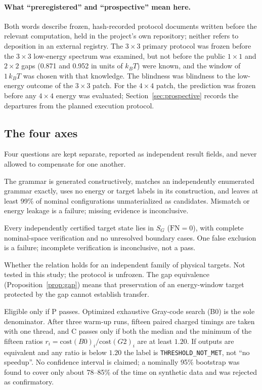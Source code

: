 \documentclass[11pt,a4paper]{article}
\theoremstyle{plain}
\theoremstyle{definition}
\theoremstyle{remark}
\newcommand{\lean}[1]{\nolinkurl{#1}}
\newcommand{\SG}{S_{G}}
\newcommand{\kBT}{k_{B}T}
\begin{document}
\paragraph{What ``preregistered'' and ``prospective'' mean here.}
Both words describe frozen, hash-recorded protocol documents written before the relevant computation, held in the project's own repository; neither refers to deposition in an external registry. The $3\times3$ primary protocol was frozen before the $3\times3$ low-energy spectrum was examined, but not before the public $1\times1$ and $2\times2$ gaps (0.871 and 0.952 in units of $\kBT$) were known, and the window of $1\,\kBT$ was chosen with that knowledge. The blindness was blindness to the low-energy outcome of the $3\times3$ patch. For the $4\times4$ patch, the prediction was frozen before any $4\times4$ energy was evaluated; Section~\ref{sec:prospective} records the departures from the planned execution protocol.

\subsection{The four axes}
Four questions are kept separate, reported as independent result fields, and never allowed to compensate for one another.

\begin{description}[leftmargin=1.2em,labelindent=0pt,itemsep=0.25em]
\item[G, generative contraction.] The grammar is generated constructively, matches an independently enumerated grammar exactly, uses no energy or target labels in its construction, and leaves at least 99\% of nominal configurations unmaterialized as candidates. Mismatch or energy leakage is a failure; missing evidence is inconclusive.
\item[P, physical preservation.] Every independently certified target state lies in $\SG$ ($\mathrm{FN}=0$), with complete nominal-space verification and no unresolved boundary cases. One false exclusion is a failure; incomplete verification is inconclusive, not a pass.
\item[T, independent transfer.] Whether the relation holds for an independent family of physical targets. Not tested in this study; the protocol is unfrozen. The gap equivalence (Proposition~\ref{prop:gap}) means that preservation of an energy-window target protected by the gap cannot establish transfer.
\item[C, charged computational consequence.] Eligible only if P passes. Optimized exhaustive Gray-code search (B0) is the sole denominator. After three warm-up runs, fifteen paired charged timings are taken with one thread, and C passes only if both the median and the minimum of the fifteen ratios $r_i=\mathrm{cost}(B0)_i/\mathrm{cost}(G2)_i$ are at least $1.20$. If outputs are equivalent and any ratio is below $1.20$ the label is \lean{THRESHOLD_NOT_MET}, not ``no speedup''. No confidence interval is claimed; a nominally 95\% bootstrap was found to cover only about 78--85\% of the time on synthetic data and was rejected as confirmatory.
\end{description}
\end{document}
